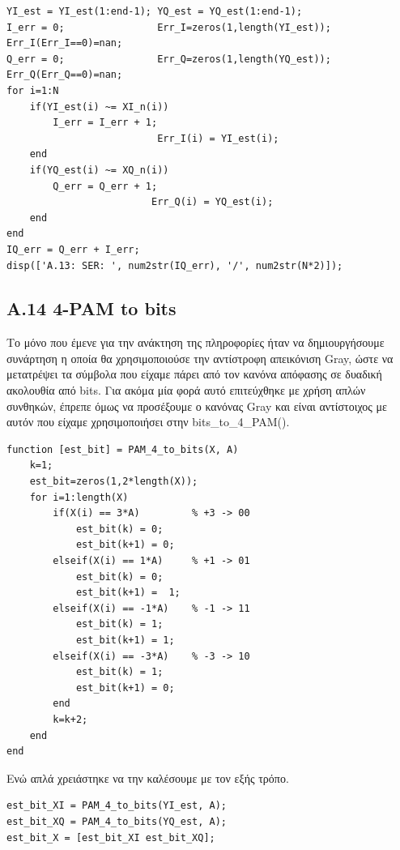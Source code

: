 \documentclass[11pt]{article}
\begin{document}
    \begin{lstlisting}[caption = {A.13 \texttt{Symbols errors}}]
% A.13
YI_est = YI_est(1:end-1); YQ_est = YQ_est(1:end-1);
I_err = 0;                Err_I=zeros(1,length(YI_est)); Err_I(Err_I==0)=nan;
Q_err = 0;                Err_Q=zeros(1,length(YQ_est)); Err_Q(Err_Q==0)=nan;
for i=1:N
    if(YI_est(i) ~= XI_n(i))
        I_err = I_err + 1;
                          Err_I(i) = YI_est(i);
    end
    if(YQ_est(i) ~= XQ_n(i))
        Q_err = Q_err + 1;
                         Err_Q(i) = YQ_est(i);
    end
end
IQ_err = Q_err + I_err;
disp(['A.13: SER: ', num2str(IQ_err), '/', num2str(N*2)]);
    \end{lstlisting}
    
    \subsection*{A.14 4-PAM to bits}
    Το μόνο που έμενε για την ανάκτηση της πληροφορίες ήταν να δημιουργήσουμε συνάρτηση η οποία θα χρησιμοποιούσε την αντίστροφη απεικόνιση Gray, ώστε να μετατρέψει τα σύμβολα που είχαμε πάρει από τον κανόνα απόφασης σε δυαδική ακολουθία από bits. 
    Για ακόμα μία φορά αυτό επιτεύχθηκε με χρήση απλών συνθηκών, έπρεπε όμως να προσέξουμε ο κανόνας Gray και είναι αντίστοιχος με αυτόν που είχαμε χρησιμοποιήσει στην bits\_to\_4\_PAM().
    
    \begin{lstlisting}[caption = {\texttt{PAM\_4\_to\_bits()}}]
function [est_bit] = PAM_4_to_bits(X, A)
    k=1;
    est_bit=zeros(1,2*length(X));
    for i=1:length(X)
        if(X(i) == 3*A)         % +3 -> 00
            est_bit(k) = 0;
            est_bit(k+1) = 0;
        elseif(X(i) == 1*A)     % +1 -> 01
            est_bit(k) = 0;
            est_bit(k+1) =  1;
        elseif(X(i) == -1*A)    % -1 -> 11
            est_bit(k) = 1;
            est_bit(k+1) = 1;
        elseif(X(i) == -3*A)    % -3 -> 10
            est_bit(k) = 1;
            est_bit(k+1) = 0;
        end
        k=k+2;
    end
end
    \end{lstlisting}
    
    \par \noindent
    Ενώ απλά χρειάστηκε να την καλέσουμε με τον εξής τρόπο.
    
    \begin{lstlisting}[caption = {A.14 \texttt{4-PAM to bits}}]
% A.14
est_bit_XI = PAM_4_to_bits(YI_est, A);
est_bit_XQ = PAM_4_to_bits(YQ_est, A);
est_bit_X = [est_bit_XI est_bit_XQ];
    \end{lstlisting}
    
\end{document}
